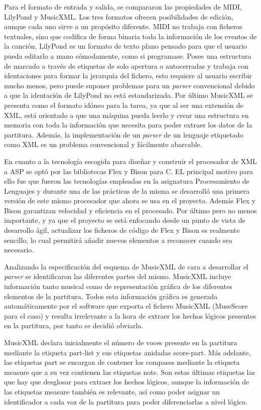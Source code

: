 Para el formato de entrada y salida, se compararon las propiedades de MIDI, LilyPond y MusicXML. Los tres formatos ofrecen posibilidades de edición, aunque cada uno sirve a un propósito diferente. MIDI no trabaja con ficheros textuales, sino que codifica de forma binaria toda la información de los eventos de la canción, LilyPond es un formato de texto plano pensado para que el usuario pueda editarlo a mano cómodamente, como si programase. Posee una estructura de marcado a través de etiquetas de solo apertura o autocerradas y trabaja con identaciones para formar la jerarquía del fichero, esto requiere al usuario escribir mucho menos, pero puede suponer problemas para un \textit{parser} convencional debido a que la identación de LilyPond no está estandarizada. Por último MusicXML se presenta como el formato idóneo para la tarea, ya que al ser una extensión de XML, está orientado a que una máquina pueda leerlo y crear una estructura en memoria con toda la información que necesita para poder extraer los datos de la partitura. Además, la implementación de un \textit{parser} de un lenguaje etiquetado como XML es un problema convencional y fácilmente abarcable.

En cuanto a la tecnología escogida para diseñar y construir el procesador de XML a ASP se optó por las bibliotecas Flex y Bison para C. EL principal motivo para ello fue que fueron las tecnologías empleadas en la asignatura Procesamiento de Lenguajes y durante una de las prácticas de la misma se desarrolló una primera versión de este mismo procesador que ahora se usa en el proyecto. Además Flex y Bison garantizan velocidad y eficiencia en el procesado. Por último pero no menos importante, y ya que el proyecto se está enfocando desde un punto de vista de desarrollo ágil, actualizar los ficheros de código de Flex y Bison es realmente sencillo, lo cual permitirá añadir nuevos elementos a reconocer cuando sea necesario.

Analizando la especificación del esquema de MusicXML de cara a desarrollar el \textit{parser} se identificaron las diferentes partes del mismo. MusicXML incluye información tanto musical como de representación gráfica de los diferentes elementos de la partitura. Todos esta información gráfica es generada automáticamente por el software que exporta el fichero MusicXML (MuseScore para el caso) y resulta irrelevante a la hora de extraer los hechos lógicos presentes en la partitura, por tanto se decidió obviarla. 

MusicXML declara inicialmente el número de voces presente en la partitura mediante la etiqueta part-list y sus etiquetas anidadas score-part. Más adelante, las etiquetas part se encargan de contener los compases mediante la etiqueta measure que a su vez contienen las etiquetas note. Son estas últimas etiquetas las que hay que desglosar para extraer los hechos lógicos, aunque la información de las etiquetas measure también es relevante, así como poder asignar un identificador a cada voz de la partitura para poder diferenciarlas a nivel lógico.

